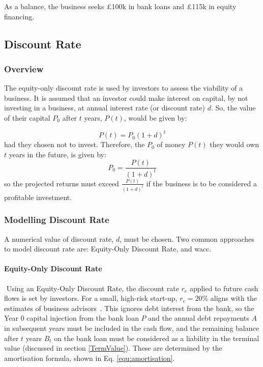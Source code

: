 \documentclass{report_template_oxford}
\begin{document}
\noindent As a balance, the business seeks £100k in bank loans and £115k in equity financing. 

\subsection{Discount Rate}
\subsubsection{Overview}
The equity-only discount rate is used by investors to assess the viability of a business. It is assumed that an investor could make interest on capital, by not investing in a business, at annual interest rate (or discount rate) \(d\). So, the value of their capital \(P_0\) after \(t\) years, \(P(t)\), would be given by:

\begin{equation}
    P(t)=P_0(1+d)^t
\end{equation} had they chosen not to invest. Therefore, the  \(P_0\) of money \(P(t)\) they would own \(t\) years in the future, is given by:
\begin{equation}
    P_0=\frac{P(t)}{(1+d)^t}
\end{equation} so the projected returns must exceed \(\frac{P(t)}{(1+d)^t}\) if the business is to be considered a profitable investment.



\subsubsection{Modelling Discount Rate}
\label{DiscountRate}
A numerical value of discount rate, \(d\), must be chosen. Two common approaches to model discount rate are: Equity-Only Discount Rate, and \gls{wacc}.
\paragraph{Equity-Only Discount Rate} \(\)\newline
Using an Equity-Only Discount Rate, the discount rate \(r_e\) applied to future cash flows is set by investors. For a small, high-risk start-up, \(r_e=20\%\) aligns with the estimates of business advisors~\cite{EquityDiscountRate}. This ignores debt interest from the bank, so the Year 0 capital injection from the bank loan \(P\) and the annual debt repayments \(A\) in subsequent years must be included in the cash flow, and the remaining balance after \(t\) years \(B_t\) on the bank loan must be considered as a liability in the terminal value (discussed in section \ref{TermValue}). These are determined by the amortisation formula, shown in Eq. \ref{equ:amortisation}.
\end{document}
